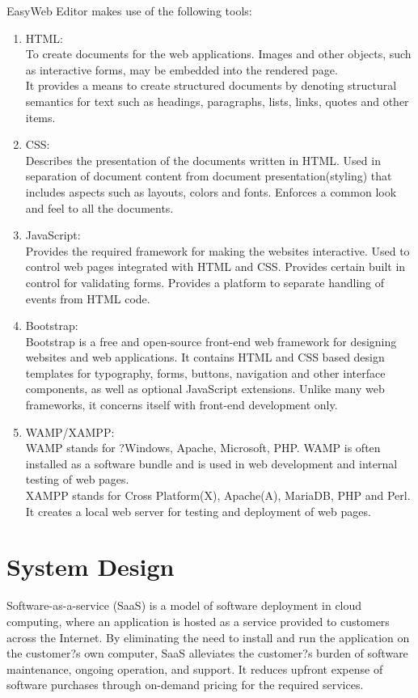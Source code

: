 \documentclass[12pt,a4paper]{article}
\begin{document}
EasyWeb Editor makes use of the following tools:
\begin{enumerate}
\item HTML:\\To create documents for the web applications.
Images and other objects, such as interactive forms, may be embedded into the rendered page.\\
It provides a means to create structured documents by denoting structural semantics for text such as headings, paragraphs, lists, links, quotes and other items.
\item CSS:\\Describes the presentation of the documents written in HTML. Used in separation of document content from document presentation(styling) that includes aspects such as layouts, colors and fonts.
Enforces a common look and feel to all the documents.\cite{css}
\item JavaScript: \\ Provides the required framework for making the websites interactive. Used to control web pages integrated with HTML and CSS.
Provides certain built in control for validating forms.
Provides a platform to separate handling of events from HTML code.\cite{javascript}
\item Bootstrap:\\Bootstrap is a free and open-source front-end web framework for designing websites and web applications. It contains HTML and CSS based design templates for typography, forms, buttons, navigation and other interface components, as well as optional JavaScript extensions.
Unlike many web frameworks, it concerns itself with front-end development only.\cite{bootstrap}
\item WAMP/XAMPP:\\WAMP stands for ?Windows, Apache, Microsoft, PHP. WAMP is often installed as a software bundle and is used in web development and internal testing of web pages.\\
XAMPP stands for Cross Platform(X), Apache(A), MariaDB, PHP and Perl. It creates a local web server for testing and deployment of web pages.
\end{enumerate}
\newpage

\section{System Design}
Software-as-a-service (SaaS) is a model of software deployment in cloud computing, where an application is hosted as a service provided to customers across the Internet. By eliminating the need to install and run the application on the customer?s own computer, SaaS alleviates the customer?s burden of software maintenance, ongoing operation, and support. It reduces upfront expense of software purchases through on-demand pricing for the required services.
\end{document}
